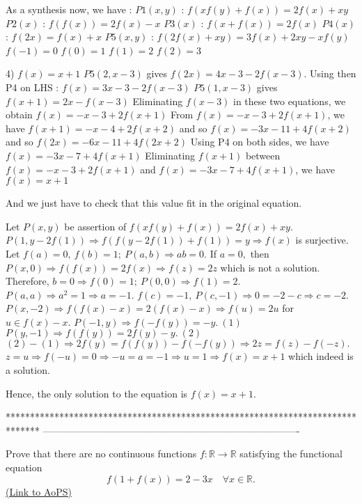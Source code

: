 \begin{mysolution}
As a synthesis now, we have :
$ P1(x,y)$ : $ f(xf(y) + f(x)) = 2f(x) + xy$ 
$ P2(x)$ : $ f(f(x))=2f(x)-x$
$ P3(x)$ : $ f(x+f(x))=2f(x)$
$ P4(x)$ : $ f(2x)=f(x)+x$
$ P5(x,y)$ : $ f(2f(x)+xy)=3f(x)+2xy-xf(y)$
$ f(-1)=0$
$ f(0)=1$
$ f(1)=2$
$ f(2)=3$

4) $ f(x)=x+1$
$ P5(2,x-3)$ gives $ f(2x)=4x-3-2f(x-3)$. Using then P4 on LHS : $ f(x)=3x-3-2f(x-3)$
$ P5(1,x-3)$ gives $ f(x+1)=2x-f(x-3)$
Eliminating $ f(x-3)$ in these two equations, we obtain $ f(x)=-x-3+2f(x+1)$
From $ f(x)=-x-3+2f(x+1)$, we have $ f(x+1)=-x-4+2f(x+2)$ and so $ f(x)=-3x-11+4f(x+2)$ and so $ f(2x)=-6x-11+4f(2x+2)$
Using  P4 on both sides, we have $ f(x)=-3x-7+4f(x+1)$
Eliminating $ f(x+1)$ between $ f(x)=-x-3+2f(x+1)$ and $ f(x)=-3x-7+4f(x+1)$, we have $ f(x)=x+1$

And we just have to check that this value fit in the original equation.
\end{mysolution}



\begin{mysolution}
	Let $ P(x,y) $ be assertion of $ f(xf(y)+f(x))=2f(x)+xy. $
$ P(1,y-2f(1))\Rightarrow f(f(y-2f(1))+f(1))=y\Rightarrow f(x) $ is surjective.
Let $ f(a)=0,\ f(b)=1;\ P(a,b)\Rightarrow ab=0. $
If $ a=0, $ then $ P(x,0)\Rightarrow f(f(x))=2f(x)\Rightarrow f(z)=2z $ which is not a solution.
Therefore, $ b=0\Rightarrow f(0)=1;\ P(0,0)\Rightarrow f(1)=2. $
$ P(a,a)\Rightarrow a^2=1\Rightarrow a=-1. $
$ f(c)=-1,\ P(c,-1)\Rightarrow 0=-2-c\Rightarrow c=-2. $
$ P(x,-2)\Rightarrow f(f(x)-x)=2(f(x)-x)\Rightarrow f(u)=2u $ for $ u\in f(x)-x. $
$ P(-1,y)\Rightarrow f(-f(y))=-y.\ (1) $
$ P(y,-1)\Rightarrow f(f(y))=2f(y)-y.\ (2) $
$ (2)-(1)\Rightarrow 2f(y)=f(f(y))-f(-f(y))\Rightarrow 2z=f(z)-f(-z). $
$ z=u\Rightarrow f(-u)=0\Rightarrow -u=a=-1\Rightarrow u=1\Rightarrow f(x)=x+1 $ which indeed is a solution.

Hence, the only solution to the equation is $ f(x)=x+1. $
\end{mysolution}
*******************************************************************************
-------------------------------------------------------------------------------

\begin{problem}
	Prove that there are no continuous functions $f: \mathbb R \to \mathbb R$ satisfying the functional equation
\[f(1+f(x))=2-3x \quad \forall x \in \mathbb R.\]
	\flushright \href{https://artofproblemsolving.com/community/c6h167749}{(Link to AoPS)}
\end{problem}



